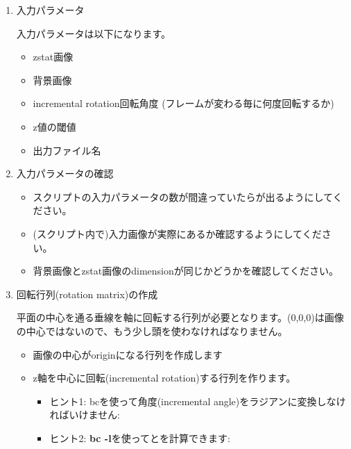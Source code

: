 \documentclass{jsarticle}
\begin{document}
\begin{enumerate}

\item 入力パラメータ

入力パラメータは以下になります。

	\begin{itemize}
	\item zstat画像
	\item 背景画像
	\item incremental rotation回転角度 (フレームが変わる毎に何度回転するか)
	\item z値の閾値
	\item 出力ファイル名
	\end{itemize}

\item 入力パラメータの確認

	\begin{itemize}
	\item スクリプトの入力パラメータの数が間違っていたら{\color{red}}が出るようにしてください。
	\item (スクリプト内で)入力画像が実際にあるか確認するようにしてください。
	\item 背景画像とzstat画像のdimensionが同じかどうかを確認してください。
	\end{itemize}


\item 回転行列(rotation matrix)の作成

{\color{red}}平面の中心を通る垂線を軸に回転する行列が必要となります。(0,0,0)は画像の中心ではないので、もう少し頭を使わなければなりません。

	\begin{itemize}
	\item 画像の中心がoriginになる行列を作成します

	\item z軸を中心に回転(incremental rotation)する行列を作ります。

		\begin{itemize}
		\item ヒント1: bcを使って角度(incremental angle)をラジアンに変換しなければいけません: {\color{red}} %

		\item ヒント2: {\bf bc -l}を使って{\color{red}}と{\color{red}}を計算できます: {\color{red}} 
		\end{itemize}


\end{itemize}
\end{enumerate}
\end{document}
